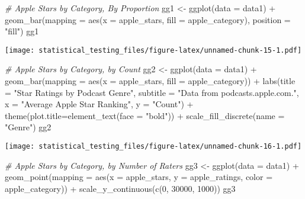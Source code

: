 \documentclass[
]{article}
\newenvironment{Shaded}{\begin{snugshade}}{\end{snugshade}}
\newcommand{\AttributeTok}[1]{\textcolor[rgb]{0.77,0.63,0.00}{#1}}
\newcommand{\CommentTok}[1]{\textcolor[rgb]{0.56,0.35,0.01}{\textit{#1}}}
\newcommand{\DecValTok}[1]{\textcolor[rgb]{0.00,0.00,0.81}{#1}}
\newcommand{\FunctionTok}[1]{\textcolor[rgb]{0.00,0.00,0.00}{#1}}
\newcommand{\NormalTok}[1]{#1}
\newcommand{\OtherTok}[1]{\textcolor[rgb]{0.56,0.35,0.01}{#1}}
\newcommand{\SpecialCharTok}[1]{\textcolor[rgb]{0.00,0.00,0.00}{#1}}
\newcommand{\StringTok}[1]{\textcolor[rgb]{0.31,0.60,0.02}{#1}}
\begin{document}
\begin{Shaded}
\begin{Highlighting}[]
\CommentTok{\# Apple Stars by Category, By Proportion}
\NormalTok{gg1 }\OtherTok{\textless{}{-}} \FunctionTok{ggplot}\NormalTok{(}\AttributeTok{data =}\NormalTok{ data1) }\SpecialCharTok{+}
  \FunctionTok{geom\_bar}\NormalTok{(}\AttributeTok{mapping =} \FunctionTok{aes}\NormalTok{(}\AttributeTok{x =}\NormalTok{ apple\_stars, }\AttributeTok{fill =}\NormalTok{ apple\_category), }\AttributeTok{position =} \StringTok{"fill"}\NormalTok{)}
\NormalTok{gg1}
\end{Highlighting}
\end{Shaded}

\texttt{[image: statistical\_testing\_files/figure-latex/unnamed-chunk-15-1.pdf]}

\begin{Shaded}
\begin{Highlighting}[]
\CommentTok{\# Apple Stars by Category, by Count}
\NormalTok{gg2 }\OtherTok{\textless{}{-}} \FunctionTok{ggplot}\NormalTok{(}\AttributeTok{data =}\NormalTok{ data1) }\SpecialCharTok{+}
  \FunctionTok{geom\_bar}\NormalTok{(}\AttributeTok{mapping =} \FunctionTok{aes}\NormalTok{(}\AttributeTok{x =}\NormalTok{ apple\_stars, }\AttributeTok{fill =}\NormalTok{ apple\_category)) }\SpecialCharTok{+}
  \FunctionTok{labs}\NormalTok{(}\AttributeTok{title =} \StringTok{"Star Ratings by Podcast Genre"}\NormalTok{,}
       \AttributeTok{subtitle =} \StringTok{"Data from podcasts.apple.com."}\NormalTok{,}
       \AttributeTok{x =} \StringTok{"Average Apple Star Ranking"}\NormalTok{,}
       \AttributeTok{y =} \StringTok{"Count"}\NormalTok{) }\SpecialCharTok{+}
  \FunctionTok{theme}\NormalTok{(}\AttributeTok{plot.title=}\FunctionTok{element\_text}\NormalTok{(}\AttributeTok{face =} \StringTok{"bold"}\NormalTok{)) }\SpecialCharTok{+}
   \FunctionTok{scale\_fill\_discrete}\NormalTok{(}\AttributeTok{name =} \StringTok{"Genre"}\NormalTok{)}
\NormalTok{gg2}
\end{Highlighting}
\end{Shaded}

\texttt{[image: statistical\_testing\_files/figure-latex/unnamed-chunk-16-1.pdf]}

\begin{Shaded}
\begin{Highlighting}[]
\CommentTok{\# Apple Stars by Category, by Number of Raters}
\NormalTok{gg3 }\OtherTok{\textless{}{-}} \FunctionTok{ggplot}\NormalTok{(}\AttributeTok{data =}\NormalTok{ data1) }\SpecialCharTok{+}
  \FunctionTok{geom\_point}\NormalTok{(}\AttributeTok{mapping =} \FunctionTok{aes}\NormalTok{(}\AttributeTok{x =}\NormalTok{ apple\_stars, }\AttributeTok{y =}\NormalTok{ apple\_ratings, }\AttributeTok{color =}\NormalTok{ apple\_category)) }\SpecialCharTok{+}
  \FunctionTok{scale\_y\_continuous}\NormalTok{(}\FunctionTok{c}\NormalTok{(}\DecValTok{0}\NormalTok{, }\DecValTok{30000}\NormalTok{, }\DecValTok{1000}\NormalTok{))}
\NormalTok{gg3}
\end{Highlighting}
\end{Shaded}
\end{document}
